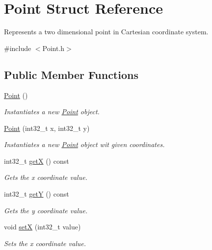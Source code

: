 \hypertarget{struct_point}{}\section{Point Struct Reference}
\label{struct_point}


Represents a two dimensional point in Cartesian coordinate system.  




{\ttfamily \#include $<$Point.\+h$>$}

\subsection*{Public Member Functions}
\begin{DoxyCompactItemize}
\item 
\mbox{\hyperlink{struct_point_ad92f2337b839a94ce97dcdb439b4325a}{Point}} ()
\begin{DoxyCompactList}\small\item\em Instantiates a new \mbox{\hyperlink{struct_point}{Point}} object. \end{DoxyCompactList}\item 
\mbox{\hyperlink{struct_point_ab6cb04aa3731364d1a6ea28e876b0eda}{Point}} (int32\+\_\+t x, int32\+\_\+t y)
\begin{DoxyCompactList}\small\item\em Instantiates a new \mbox{\hyperlink{struct_point}{Point}} object wit given coordinates. \end{DoxyCompactList}\item 
int32\+\_\+t \mbox{\hyperlink{struct_point_a46c064951bdb12e4cd3a53de22128367}{getX}} () const
\begin{DoxyCompactList}\small\item\em Gets the x coordinate value. \end{DoxyCompactList}\item 
int32\+\_\+t \mbox{\hyperlink{struct_point_a9819e3077a2e0f7ecfd02aa5e50d7476}{getY}} () const
\begin{DoxyCompactList}\small\item\em Gets the y coordinate value. \end{DoxyCompactList}\item 
void \mbox{\hyperlink{struct_point_a1921d1ddb2f6598197a1dbaaf02fa601}{setX}} (int32\+\_\+t value)
\begin{DoxyCompactList}\small\item\em Sets the x coordinate value. \end{DoxyCompactList}\item 

\end{DoxyCompactItemize}
